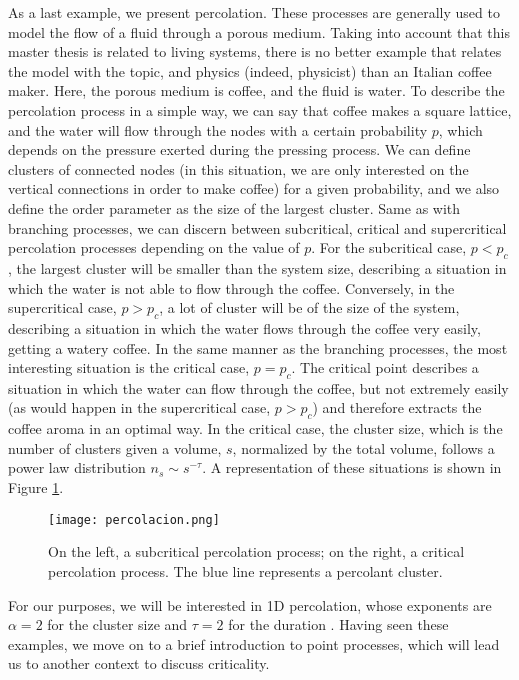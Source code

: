 As a last example, we present percolation. These processes are generally used to model the flow of a fluid through a porous medium. Taking into account that this master 
thesis is related to living systems, there is no better example that relates the model with the topic, and physics (indeed, physicist) than an Italian coffee maker. Here, the porous 
medium is coffee, and the fluid is water. To describe the percolation process in a simple way, we can say that coffee makes a square lattice, and the water will flow through the nodes 
with a certain probability $p$, which depends on the pressure exerted during the pressing process. 
We can define clusters of connected nodes (in this situation, we are only interested on the vertical connections in order to make coffee)
for a given probability, and we also define the order parameter as the size of the largest cluster. 
Same as with branching processes, we can discern between subcritical, critical and supercritical percolation processes depending on the value of $p$. For the subcritical case, $p<p_c$,
the largest cluster will be smaller than the system size, describing a situation in which the water is not able to flow through the coffee. Conversely, in the supercritical case, $p>p_c$,
a lot of cluster will be of the size of the system, describing a situation in which the water flows through the coffee very easily, getting a watery coffee. 
In the same manner as the branching processes, the most interesting situation is the critical case, $p=p_c$. The critical point describes a situation in which the water can flow through the
coffee, but not extremely easily (as would happen in the supercritical case, $p>p_c$) and therefore extracts the coffee aroma in an optimal way. In the critical case, the cluster size, which 
is the number of clusters given a volume, $s$, normalized by the total volume, follows a power law distribution $n_s\sim s^{-\tau}$.
A representation of these situations is shown in Figure \ref{f:percolation}.

\begin{figure}[H]
    \centering
    \texttt{[image: percolacion.png]}
    \caption{On the left, a subcritical percolation process; on the right, a critical percolation process. The blue line represents a percolant cluster.}
    \label{f:percolation}
\end{figure}
For our purposes, we will be interested in 1D percolation, whose exponents are $\alpha=2$ for the cluster size and $\tau=2$ for the duration \cite{stauffer2018introduction}. 
Having seen these examples, we move on to a brief introduction to point processes, which will lead us to another context to discuss criticality.

